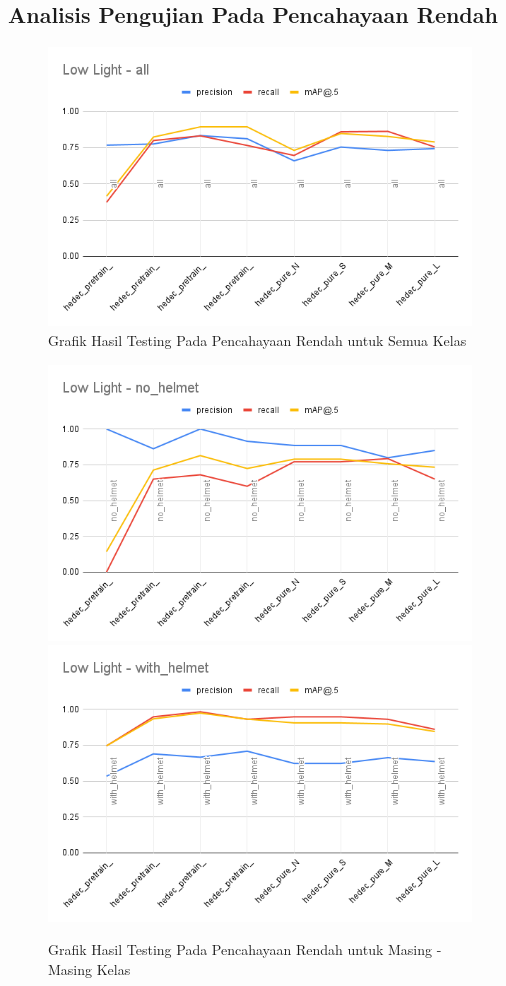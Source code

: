 \subsection{Analisis Pengujian Pada Pencahayaan Rendah}
  \label{subsec:analisis_lowlight}

  \begin{figure} [h!]
    \centering
    \includegraphics[width=1.0\textwidth]{gambar/lowlight_grafic/Low Light - all.png}
    \caption{Grafik Hasil Testing Pada Pencahayaan Rendah untuk Semua Kelas}
    \label{fig:graf_lowlight_all}  
  \end{figure}

  \begin{figure} [h!]
    \centering
    \includegraphics[width=.45\textwidth]{gambar/lowlight_grafic/Low Light - no_helmet.png}
    \includegraphics[width=.45\textwidth]{gambar/lowlight_grafic/Low Light - with_helmet.png}
    \caption{Grafik Hasil Testing Pada Pencahayaan Rendah untuk Masing - Masing Kelas}
    \label{fig:graf_lowlight_eachclass}  
  \end{figure}

